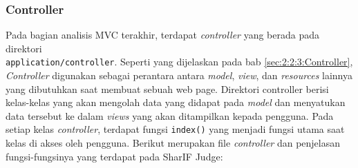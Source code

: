 \subsubsection{Controller}
\label{sec:3:1:1:controller}

Pada bagian analisis MVC terakhir, terdapat \textit{controller} yang berada pada direktori \\ \verb|application/controller|. Seperti yang dijelaskan pada bab \ref{sec:2:2:3:Controller}, \textit{Controller} digunakan sebagai perantara antara \textit{model}, \textit{view}, dan \textit{resources} lainnya yang dibutuhkan saat membuat sebuah web page. Direktori controller berisi kelas-kelas yang akan mengolah data yang didapat pada \textit{model} dan menyatukan data tersebut ke dalam \textit{views} yang akan ditampilkan kepada pengguna. Pada setiap kelas \textit{controller}, terdapat fungsi \verb|index()| yang menjadi fungsi utama saat kelas di akses oleh pengguna. Berikut merupakan file \textit{controller} dan penjelasan fungsi-fungsinya yang terdapat pada SharIF Judge:

